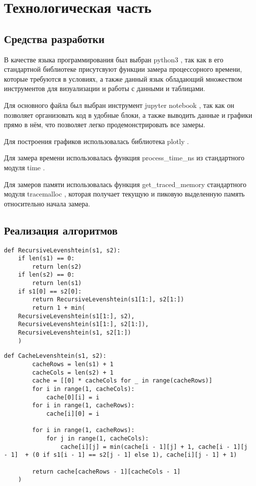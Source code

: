 \chapter{Технологическая часть}
\section{Средства разработки}

В качестве языка программирования был выбран python3 \cite{python3}, так как в его стандартной библиотеке присутсвуют функции замера процессорного времени, которые требуются в условиях, а также данный язык обладающий множеством инструментов для визуализации и работы с данными и таблицами.

Для основного файла был выбран инструмент jupyter notebook \cite{python3-jupyter}, так как он позволяет организовать код в удобные блоки,  а также выводить данные и графики прямо в нём, что позволяет легко продемонстрировать все замеры.

Для построения графиков использовалась библиотека plotly  \cite{python3-plotly}.

Для замера времени использовалась функция process\_time\_ns из стандартного модуля time \cite{python3-time}.

Для замеров памяти использовалась функция get\_traced\_memory стандартного модуля tracemalloc \cite{tracemalloc}, которая получает текущую и пиковую выделенную память относительно начала замера.

\section{Реализация алгоритмов}

\begin{lstlisting}[label=recursive-levenshtein,caption={Рекурсивный алгоритм нахождения расстояния Левенштейна}]
def RecursiveLevenshtein(s1, s2):
	if len(s1) == 0:
		return len(s2)
	if len(s2) == 0:
		return len(s1)
	if s1[0] == s2[0]:
		return RecursiveLevenshtein(s1[1:], s2[1:])
		return 1 + min(
	RecursiveLevenshtein(s1[1:], s2),
	RecursiveLevenshtein(s1[1:], s2[1:]),
	RecursiveLevenshtein(s1, s2[1:])
	)
\end{lstlisting}

\begin{lstlisting}[label=cache-levenshtein,caption={Итерационный алгоритм нахождения расстояния Левенштейна с кешэм}]
	def CacheLevenshtein(s1, s2):
		cacheRows = len(s1) + 1
		cacheCols = len(s2) + 1
		cache = [[0] * cacheCols for _ in range(cacheRows)]
		for i in range(1, cacheCols):
			cache[0][i] = i
		for i in range(1, cacheRows):
			cache[i][0] = i
		
		for i in range(1, cacheRows):
			for j in range(1, cacheCols):
				cache[i][j] = min(cache[i - 1][j] + 1, cache[i - 1][j - 1]  + (0 if s1[i - 1] == s2[j - 1] else 1), cache[i][j - 1] + 1)
		
		return cache[cacheRows - 1][cacheCols - 1]
	)
\end{lstlisting}

